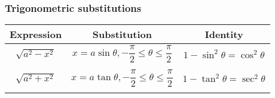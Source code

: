 \documentclass[
]{article}
\begin{document}
\hypertarget{trigonometric-substitutions}{%
\subsubsection{Trigonometric
substitutions}\label{trigonometric-substitutions}}

\begin{longtable}[]{@{}ccc@{}}
\toprule
\begin{minipage}[b]{0.30\columnwidth}\centering
Expression\strut
\end{minipage} & \begin{minipage}[b]{0.30\columnwidth}\centering
Substitution\strut
\end{minipage} & \begin{minipage}[b]{0.30\columnwidth}\centering
Identity\strut
\end{minipage}\tabularnewline
\midrule
\endhead
\begin{minipage}[t]{0.30\columnwidth}\centering
\(\sqrt{a^2-x^2}\)\strut
\end{minipage} & \begin{minipage}[t]{0.30\columnwidth}\centering
\(x = a\sin \theta, -\dfrac{\pi}{2} \leq \theta \leq \dfrac{\pi}{2}\)\strut
\end{minipage} & \begin{minipage}[t]{0.30\columnwidth}\centering
\(1 - \sin^2 \theta = \cos^2 \theta\)\strut
\end{minipage}\tabularnewline
\begin{minipage}[t]{0.30\columnwidth}\centering
\strut
\end{minipage} & \begin{minipage}[t]{0.30\columnwidth}\centering
\strut
\end{minipage} & \begin{minipage}[t]{0.30\columnwidth}\centering
\strut
\end{minipage}\tabularnewline
\begin{minipage}[t]{0.30\columnwidth}\centering
\(\sqrt{a^2+x^2}\)\strut
\end{minipage} & \begin{minipage}[t]{0.30\columnwidth}\centering
\(x = a\tan \theta, -\dfrac{\pi}{2} \leq \theta \leq \dfrac{\pi}{2}\)\strut
\end{minipage} & \begin{minipage}[t]{0.30\columnwidth}\centering
\(1 - \tan^2 \theta = \sec^2 \theta\)\strut
\end{minipage}\tabularnewline
\begin{minipage}[t]{0.30\columnwidth}\centering

\end{minipage}
\end{longtable}
\end{document}
